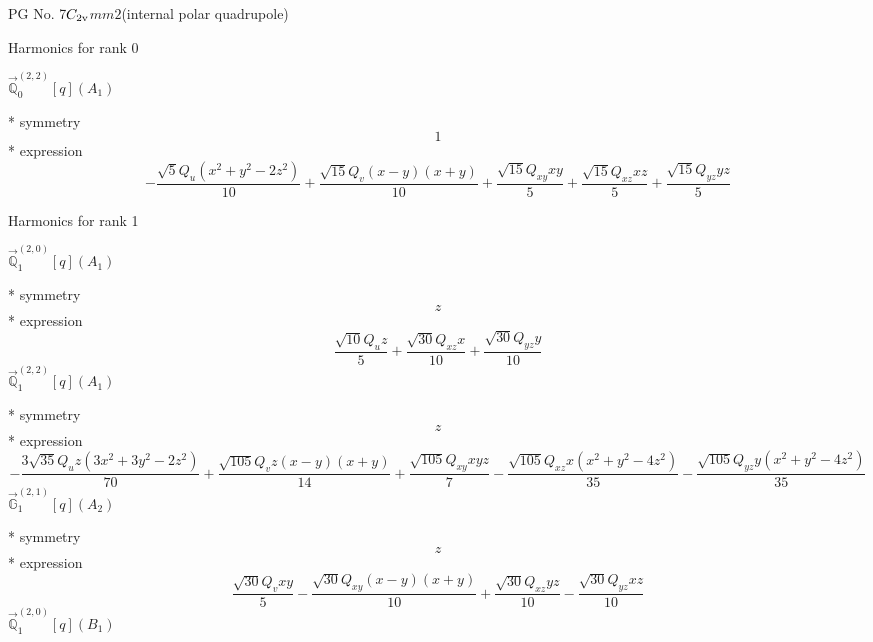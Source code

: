 \documentclass[fleqn,8pt]{jsarticle}
\begin{document}
\setcounter{MaxMatrixCols}{32}

\renewcommand{\tablename}{Table~}
\renewcommand{\figurename}{Figure~}
\begin{center}
\LARGE
PG No. 7\quad$C_{\rm 2v}$\quad$mm2$\quad[ orthorhombic ] (internal polar quadrupole)
\end{center}

\noindent * Harmonics for rank 0

\noindent\quad $\vec{\mathbb{Q}}_{0}^{(2,2)}[q](A_{1})$

\noindent\quad ** symmetry
\begin{dmath*}
1
\end{dmath*}
\noindent\quad ** expression
\begin{dmath*}
- \frac{\sqrt{5} Q_{u} \left(x^{2} + y^{2} - 2 z^{2}\right)}{10} + \frac{\sqrt{15} Q_{v} \left(x - y\right) \left(x + y\right)}{10} + \frac{\sqrt{15} Q_{xy} x y}{5} + \frac{\sqrt{15} Q_{xz} x z}{5} + \frac{\sqrt{15} Q_{yz} y z}{5}
\end{dmath*}

\noindent * Harmonics for rank 1

\noindent\quad $\vec{\mathbb{Q}}_{1}^{(2,0)}[q](A_{1})$

\noindent\quad ** symmetry
\begin{dmath*}
z
\end{dmath*}
\noindent\quad ** expression
\begin{dmath*}
\frac{\sqrt{10} Q_{u} z}{5} + \frac{\sqrt{30} Q_{xz} x}{10} + \frac{\sqrt{30} Q_{yz} y}{10}
\end{dmath*}
\noindent\quad $\vec{\mathbb{Q}}_{1}^{(2,2)}[q](A_{1})$

\noindent\quad ** symmetry
\begin{dmath*}
z
\end{dmath*}
\noindent\quad ** expression
\begin{dmath*}
- \frac{3 \sqrt{35} Q_{u} z \left(3 x^{2} + 3 y^{2} - 2 z^{2}\right)}{70} + \frac{\sqrt{105} Q_{v} z \left(x - y\right) \left(x + y\right)}{14} + \frac{\sqrt{105} Q_{xy} x y z}{7} - \frac{\sqrt{105} Q_{xz} x \left(x^{2} + y^{2} - 4 z^{2}\right)}{35} - \frac{\sqrt{105} Q_{yz} y \left(x^{2} + y^{2} - 4 z^{2}\right)}{35}
\end{dmath*}
\noindent\quad $\vec{\mathbb{G}}_{1}^{(2,1)}[q](A_{2})$

\noindent\quad ** symmetry
\begin{dmath*}
z
\end{dmath*}
\noindent\quad ** expression
\begin{dmath*}
\frac{\sqrt{30} Q_{v} x y}{5} - \frac{\sqrt{30} Q_{xy} \left(x - y\right) \left(x + y\right)}{10} + \frac{\sqrt{30} Q_{xz} y z}{10} - \frac{\sqrt{30} Q_{yz} x z}{10}
\end{dmath*}
\noindent\quad $\vec{\mathbb{Q}}_{1}^{(2,0)}[q](B_{1})$
\end{document}
